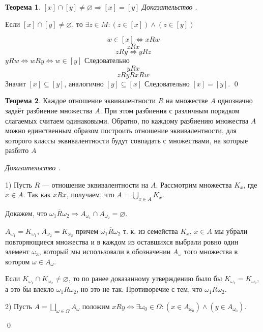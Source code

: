 \documentclass[12pt,oneside]{article}
\theoremstyle{definition}
\newtheorem{theorem}{Теорема}[section]
\newenvironment{ourproof}[1]{\textit{Доказательство #1.}}{\qed}
\begin{document}
\begin{theorem} \label{eq_t}
$[x]\cap [y]\neq \varnothing \Longrightarrow [x]=[y]$
\newline
\begin{ourproof}{}

Если $[x]\cap [y]\neq \varnothing$, то $\exists z\in M: (z\in[x])\wedge(z\in[y])$

$$w\in [x] \Leftrightarrow xRw$$
$$zRx$$ $$zRy \Leftrightarrow yRz$$
$yRw \Longleftrightarrow wRy \Longleftrightarrow w\in[y]$
Следовательно
$$yRx$$
$$zRyRxRw$$
Значит $[x]\subseteq [y]$, аналогично $[y]\subseteq [x]$
Следовательно $[x] = [y]$.
\end{ourproof}
\end{theorem}

\begin{theorem}\label{razb}
Каждое отношение эквивалентности $R$ на множестве $A$ однозначно задаёт разбиение множества $A$. При этом разбиения с различным порядком слагаемых считаем одинаковыми. Обратно, по каждому разбиению множества $A$ можно единственным образом построить отношение эквивалентности, для которого классы эквивалентности будут совпадать с множествами, на которые разбито $A$

\begin{ourproof}{}

1) Пусть $R$ --- отношение эквивалентности на $A$. Рассмотрим множества $K_x$, где $x\in A$. Так как $xRx$, получаем, что $A = \displaystyle\bigcup_{x\in A} K_{x}$.

Докажем, что $\omega_{1}\overline{R}\omega_{2} \Rightarrow A_{\omega_{1}}\cap A_{\omega_{2}} = \varnothing$.

$A_{\omega_{1}} = K_{\omega_{1}}$, $A_{\omega_{2}} = K_{\omega_{2}}$ причем $\omega_{1}\overline{R}\omega_{2}$ т. к. из семейства $K_x$, $x\in A$ мы убрали повторяющиеся множества и в каждом из оставшихся выбрали ровно один элемент $\omega_{3}$, который мы использовали в обозначении $A_{\omega}$ того множества в котором $\omega \in A_{\omega}$.

Если $K_{\omega_{1}}\cap K_{\omega_{2}} \neq \varnothing$, то по ранее доказанному утверждению было бы $K_{\omega_{1}} = K_{\omega_{2}}$, а это бы влекло $\omega_{1}R\omega_{2}$, но это не так. Противоречие с тем, что $\omega_{1}\overline{R}\omega_{2}$.

2) Пусть $A = \displaystyle\bigsqcup_{\omega \in \Omega} A_{\omega} $ положим $xRy \Leftrightarrow \exists \omega_0 \in \Omega : (x\in A_{\omega_{0}})\wedge (y\in A_{\omega_{0}})$.


\end{ourproof}
\end{theorem}
\end{document}
